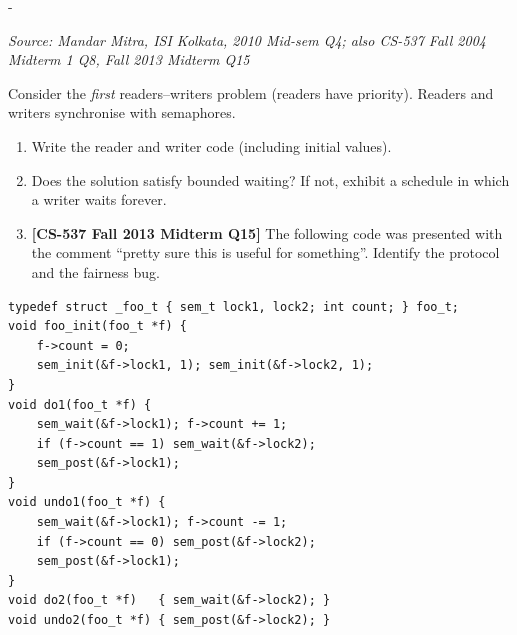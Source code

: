 \documentclass[11pt,a4paper]{article}
\makeatletter
\newcommand{\keepspace}[1]{\par\penalty-100\begingroup
  \setlength{\dimen@}{#1}\dimen@ii\pagegoal\advance\dimen@ii-\pagetotal
  \ifdim\dimen@>\dimen@ii\ifdim\dimen@ii>\z@\vfil\fi\break\fi\endgroup}
\newcounter{qn}[section]
\newenvironment{Qn}[4]{%
  \refstepcounter{qn}\keepspace{7\baselineskip}%
  \begin{tcolorbox}[qboxstyle, title={Q\thesection.\theqn\ \ [#1 \textbar\ #2]\ \ #4}]%
  {\footnotesize\color{g3}\textit{Source: #3}}\par\smallskip%
}{%
  \end{tcolorbox}%
}
\makeatother
\begin{document}
\begin{Qn}{Hard}{Lect 19}{Mandar Mitra, ISI Kolkata, 2010 Mid-sem Q4; also CS-537 Fall 2004 Midterm 1 Q8, Fall 2013 Midterm Q15}{First readers--writers, and writer starvation}
Consider the \emph{first} readers--writers problem (readers have priority).
Readers and writers synchronise with semaphores.

\begin{enumerate}
  \item[(a)] Write the reader and writer code (including initial values).
  \item[(b)] Does the solution satisfy bounded waiting? If not, exhibit a
        schedule in which a writer waits forever.
  \item[(c)] \textbf{[CS-537 Fall 2013 Midterm Q15]} The following code
        was presented with the comment ``pretty sure this is useful for
        something''. Identify the protocol and the fairness bug.
\end{enumerate}
\begin{lstlisting}[numbers=none]
typedef struct _foo_t { sem_t lock1, lock2; int count; } foo_t;
void foo_init(foo_t *f) {
    f->count = 0;
    sem_init(&f->lock1, 1); sem_init(&f->lock2, 1);
}
void do1(foo_t *f) {
    sem_wait(&f->lock1); f->count += 1;
    if (f->count == 1) sem_wait(&f->lock2);
    sem_post(&f->lock1);
}
void undo1(foo_t *f) {
    sem_wait(&f->lock1); f->count -= 1;
    if (f->count == 0) sem_post(&f->lock2);
    sem_post(&f->lock1);
}
void do2(foo_t *f)   { sem_wait(&f->lock2); }
void undo2(foo_t *f) { sem_post(&f->lock2); }
\end{lstlisting}
\end{Qn}
\end{document}
